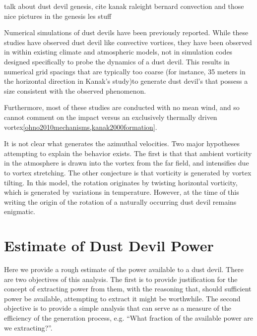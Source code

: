 talk about dust devil genesis, cite kanak raleight bernard 
convection and those nice pictures in the genesis les stuff



Numerical simulations of dust devils have been previously
reported. While these studies have observed dust
devil like convective vortices, they have been observed in within
existing climate and atmospheric
models\cite{QJ:QJ200513160722,doi:10.3137/ao.420105}, not in simulation 
codes designed specifically to probe the dynamics of a dust devil. 
This results in numerical grid spacings that are typically too coarse
(for instance, 35 meters in the horizontal direction in Kanak's
study\cite{})to generate dust devil's that possess a size consistent
with the observed phenomenon. 

Furthermore, most of these studies are conducted with no mean wind, and
so cannot comment on the impact versus an exclusively thermally driven
vortex\ref{ohno2010mechanisms,kanak2000formation}. 

It is not clear what generates the azimuthal velocities. Two major
hypotheses attempting to explain the behavior exists. The first is that
that ambient vorticity in the atmosphere is drawn into the vortex from
the far field, and intensifies due to vortex stretching\cite{?}. %
The other conjecture is that vorticity is generated by
vortex tilting. In this model, the rotation originates by twisting
horizontal vorticity, which is generated by variations in
temperature\cite{?}. %
%
%
However, at the time of this writing the origin of
the rotation of a naturally occurring dust devil remains enigmatic. 

%
%


\section{Estimate of Dust Devil Power}
\label{sec:estimate_power}

Here we provide a rough estimate of the power
available to a dust devil. There are two objectives of this
analysis. The first is to provide justification for the concept of
extracting power from them, with the reasoning that, should
sufficient power be available, attempting to extract it might be
worthwhile. The second objective is to provide a simple analysis that
can serve as a measure of the efficiency of the generation process,
e.g. ``What fraction of the available power are we extracting?''.  

